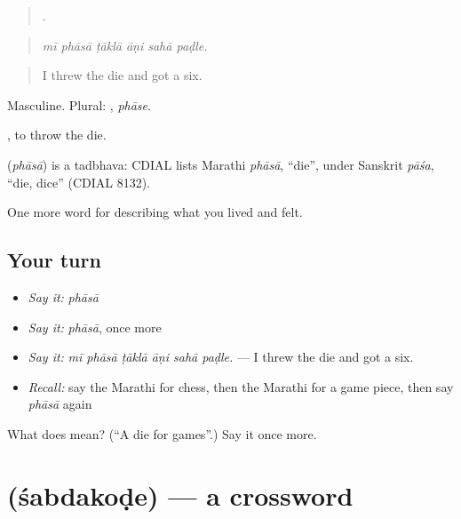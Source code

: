 \begin{quote}
     .
\end{quote}

\begin{quote}
\emph{mī phāsā ṭāklā āṇi sahā paḍle.}
\end{quote}

\begin{quote}
I threw the die and got a six.
\end{quote}

Masculine. Plural: , \emph{phāse}.

 , to throw the die.

\begin{cousinweb}
\textbf{} (\emph{phāsā}) is a tadbhava: CDIAL lists Marathi \emph{phāsā}, \textquotedblleft{}die\textquotedblright{}, under Sanskrit \emph{pāśa}, \textquotedblleft{}die, dice\textquotedblright{} (CDIAL 8132).
\end{cousinweb}

\begin{grammarlens}[title={What you've built}]
One more word for describing what you lived and felt.
\end{grammarlens}

\subsection*{Your turn}
\begin{itemize}
\raggedright
  \item \emph{Say it:} \emph{phāsā}
  \item \emph{Say it:} \emph{phāsā}, once more
  \item \emph{Say it:} \emph{mī phāsā ṭāklā āṇi sahā paḍle.} — I threw the die and got a six.
  \item \emph{Recall:} say the Marathi for chess, then the Marathi for a game piece, then say \emph{phāsā} again
\end{itemize}

\begin{tcolorbox}[breakable,colback=teal!4,colframe=teal!35!black,title={Before you move on}]
What does  mean? (\textquotedblleft{}A die for games\textquotedblright{}.) Say it once more.
\end{tcolorbox}
\section[\texorpdfstring{\mr{शब्दकोडे} (śabdakoḍe)}{शब्दकोडे (śabdakoḍe)}]{ (śabdakoḍe) — a crossword}

